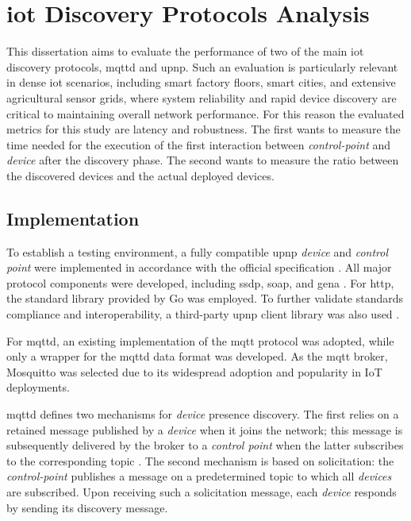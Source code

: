 \documentclass[lettersize,journal]{IEEEtran}
\begin{document}
\vspace{1em}

\section{\gls{iot} Discovery Protocols Analysis}
\label{sec_iot_discovery_protocols_analysis}
This dissertation aims to evaluate the performance of two of the main \gls{iot} discovery protocols, \gls{mqttd} and \gls{upnp}. Such an evaluation is particularly relevant in dense \gls{iot} scenarios, including smart factory floors, smart cities, and extensive agricultural sensor grids, where system reliability and rapid device discovery are critical to maintaining overall network performance. For this reason the evaluated metrics for this study are latency and robustness. The first wants to measure the time needed for the execution of the first interaction between \textit{control-point} and \textit{device} after the discovery phase. The second wants to measure the ratio between the discovered devices and the actual deployed devices.

\subsection{Implementation}

To establish a testing environment, a fully compatible \gls{upnp} \textit{device} and \textit{control point} were implemented in accordance with the official specification \cite{ocf_upnp_architecture_2020}. All major protocol components were developed, including \gls{ssdp}, \gls{soap}, and \gls{gena} \cite{DaniDF_MQTT-Discovery_vs_UPnP}. For \gls{http}, the standard library provided by Go was employed. To further validate standards compliance and interoperability, a third-party \gls{upnp} client library was also used \cite{goupnp}.

For \gls{mqttd}, an existing implementation of the \gls{mqtt} protocol was adopted, while only a wrapper for the \gls{mqttd} data format was developed. As the \gls{mqtt} broker, Mosquitto was selected due to its widespread adoption and popularity in IoT deployments.

\gls{mqttd} defines two mechanisms for \textit{device} presence discovery. The first relies on a retained message published by a \textit{device} when it joins the network; this message is subsequently delivered by the broker to a \textit{control point} when the latter subscribes to the corresponding topic \cite{mqttd}. The second mechanism is based on solicitation: the \textit{control-point} publishes a message on a predetermined topic to which all \textit{devices} are subscribed. Upon receiving such a solicitation message, each \textit{device} responds by sending its discovery message\cite{mqttd}.
\end{document}

